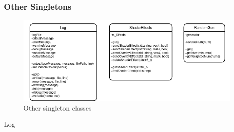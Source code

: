 \documentclass{article}
\begin{document}
            \subsubsection{Other Singletons}
                \begin{figure}[hbt!]
                    \centerline{\includegraphics[scale=0.5]{img/Classes/Singletons.png}}
                    \caption{Other singleton classes}
                    \label{fig}
                \end{figure}
                Log
\end{document}
